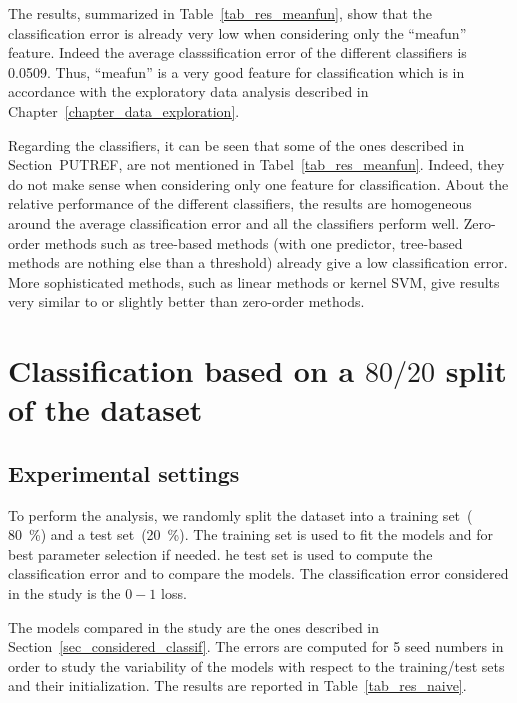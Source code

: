 The results, summarized in Table~\ref{tab_res_meanfun}, show that the classification error is already very low when considering only the ``meafun'' feature. Indeed the average classsification error of the different classifiers is \num{0.0509}. Thus, ``meafun'' is a very good feature for classification which is in accordance with the exploratory data analysis described in Chapter~\ref{chapter_data_exploration}. 

Regarding the classifiers, it can be seen that some of the ones described in Section~PUTREF, are not mentioned in Tabel~\ref{tab_res_meanfun}. Indeed, they do not make sense when considering only one feature for classification. 
About the relative performance of the different classifiers, the results are homogeneous around the average classification error and all the classifiers perform well. Zero-order methods such as tree-based methods (with one predictor, tree-based methods are nothing else than a threshold) already give a low classification error. More sophisticated methods, such as linear methods or kernel SVM, give results very similar to or slightly better than zero-order methods.

\section{Classification based on a $80/20$ split of the dataset}
\label{sec_naive_strat}

\subsection{Experimental settings}
To perform the analysis, we randomly split the dataset into a training set~( \SI{80}{\percent}) and a test set~(\SI{20}{\percent}). 
The training set is used to fit the models and for best parameter selection if needed. 
he test set is used to compute the classification error and to compare the models. The classification error considered in the study is the $0-1$ loss. 

The models compared in the study are the ones described in Section~\ref{sec_considered_classif}. 
The errors are computed for \num{5} seed numbers in order to study the variability of the models with respect to the training/test sets and their initialization. 
The results are reported in Table~\ref{tab_res_naive}.

